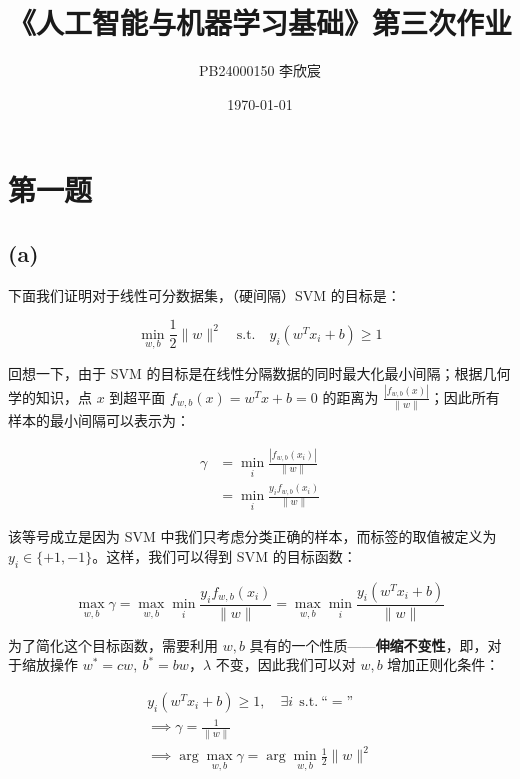 \documentclass{ctexart}
\title{《人工智能与机器学习基础》第三次作业}
\author{PB24000150 李欣宸}
\date{\today}
\begin{document}
\maketitle

\section{第一题}\label{ux7b2cux4e00ux9898}

\subsection{(a)}\label{a}

下面我们证明对于线性可分数据集，（硬间隔）SVM 的目标是：

\begin{equation*}
\min_{w,b}\frac{1}{2}\|w\|^2\quad \text{s.t.}\quad y_i(w^Tx_i+b)\ge 1
\end{equation*}

回想一下，由于 SVM
的目标是在线性分隔数据的同时最大化最小间隔；根据几何学的知识，点 \(x\)
到超平面 \(f_{w,b}(x) = w^T x + b = 0\) 的距离为
\(\frac{|f_{w,b}(x)|}{\|w\|}\)；因此所有样本的最小间隔可以表示为：


\begin{equation*}
\begin{aligned}
\gamma &= \min_{i}\frac{|f_{w,b}(x_i)|}{\|w\|} \\
&= \min_i\frac{y_if_{w,b}(x_i)}{\|w\|}
\end{aligned}
\end{equation*}


该等号成立是因为 SVM 中我们只考虑分类正确的样本，而标签的取值被定义为
\(y_i \in \{+1, -1\}\)。这样，我们可以得到 SVM 的目标函数：

\begin{equation*}
\max_{w,b}\gamma = \max_{w,b}\min_i \frac{y_i f_{w,b}(x_i)}{\|w\|} = \max_{w,b}\min_i \frac{y_i (w^Tx_i+b)}{\|w\|}
\end{equation*}

为了简化这个目标函数，需要利用 \(w,b\)
具有的一个性质------\textbf{伸缩不变性}，即，对于缩放操作
\(w^\ast = cw,~b^\ast = bw\)，\(\lambda\) 不变，因此我们可以对 \(w,b\)
增加正则化条件：


\begin{gather*}
y_i(w^Tx_i+b)\ge 1,\quad\exists i~~\text{s.t.}~\text{``}=\text{''} \\
\implies \gamma = \frac{1}{\|w\|} \\
\implies \arg\max_{w,b}\gamma = \arg\min_{w,b}\frac{1}{2}\|w\|^2
\end{gather*}
\end{document}
